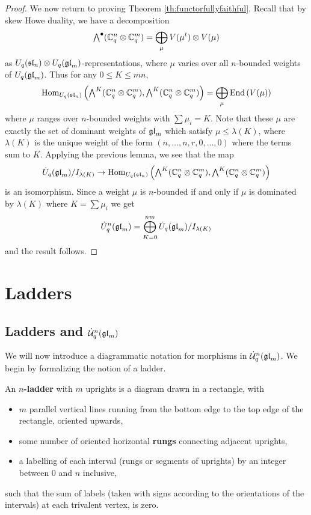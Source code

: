 \documentclass[11pt]{amsart}
\begin{document}
\begin{proof}
We now return to proving Theorem \ref{th:functorfullyfaithful}. Recall that by skew Howe duality, we have a decomposition
$$ {\textstyle\bigwedge^{\bullet}_{}} ({\mathbb{C}}_q^n \otimes {\mathbb{C}}_q^m) = \bigoplus_{\mu} V(\mu^t) \otimes V(\mu) $$
as $U_q({\mathfrak{sl}}_n) \otimes U_q({\mathfrak{gl}}_m)$-representations, where $\mu$ varies over all $n$-bounded weights of $U_q({\mathfrak{gl}}_m)$. Thus for any $ 0 \le K \le mn $,
$$ \operatorname{Hom}_{U_q({\mathfrak{sl}}_n)} \left({\textstyle\bigwedge^{K}_{}}({\mathbb{C}}_q^n \otimes {\mathbb{C}}_q^m), {\textstyle\bigwedge^{K}_{}}({\mathbb{C}}_q^n \otimes {\mathbb{C}}_q^m)\right) = \bigoplus_{\mu} \operatorname{End}\left(V(\mu)\right) $$
where $ \mu $ ranges over $ n$-bounded weights with $ \sum \mu_i = K $.  Note that these $\mu $ are exactly the set of dominant weights of $ {\mathfrak{gl}}_m $ which satisfy $ \mu \le \lambda(K) $, where $ \lambda(K) $ is the unique weight of the form $(n, \dots, n, r, 0, \dots, 0) $ where the terms sum to $K$.  Applying the previous lemma, we see that the map
$$ \dot{{U}}_q({\mathfrak{gl}}_m)/I_{\lambda(K)} \rightarrow \operatorname{Hom}_{U_q({\mathfrak{sl}}_n)} \left({\textstyle\bigwedge^{K}_{}}({\mathbb{C}}_q^n \otimes {\mathbb{C}}_q^m), {\textstyle\bigwedge^{K}_{}}({\mathbb{C}}_q^n \otimes {\mathbb{C}}_q^m)\right) $$
is an isomorphism. Since a weight $ \mu $ is $n$-bounded if and only if $ \mu $ is dominated by $ \lambda(K) $ where $ K = \sum \mu_i $ we get 
$$ \dot{{U}}_q^n({\mathfrak{gl}}_m) = \bigoplus_{K=0}^{nm} \dot{{U}}_q({\mathfrak{gl}}_m)/I_{\lambda(K)} $$
and the result follows.
\end{proof}

\section{Ladders}
\label{sec:ladders}

\subsection{Ladders and \texorpdfstring{$\dot{{\mathcal{U}}}_q^n({\mathfrak{gl}}_m)$}{U\_q gl\_m} }
We will now introduce a diagrammatic notation for morphisms in $ \dot{{\mathcal{U}}}_q^n({\mathfrak{gl}}_m)$. We begin by formalizing the notion of a ladder.

\begin{defn}
An {\bf $n$-ladder} with $m$ uprights is a diagram drawn in a rectangle, with
\begin{itemize}
\item $m$ parallel vertical lines running from the bottom edge to the top edge of the rectangle, oriented upwards,
\item some number of oriented horizontal {\bf rungs} connecting adjacent uprights,
\item a labelling of each interval (rungs or segments of uprights) by an integer between $0$ and $n$ inclusive,
\end{itemize}
such that the sum of labels (taken with signs according to the orientations of the intervals) at each trivalent vertex, is zero.
\end{defn}
\end{document}
